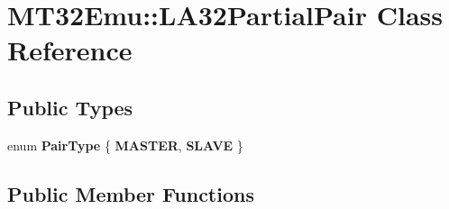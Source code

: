 \hypertarget{classMT32Emu_1_1LA32PartialPair}{\section{M\-T32\-Emu\-:\-:L\-A32\-Partial\-Pair Class Reference}
\label{classMT32Emu_1_1LA32PartialPair}
}
\subsection*{Public Types}
\begin{DoxyCompactItemize}
\item 
enum {\bfseries Pair\-Type} \{ {\bfseries M\-A\-S\-T\-E\-R}, 
{\bfseries S\-L\-A\-V\-E}
 \}
\end{DoxyCompactItemize}
\subsection*{Public Member Functions}
